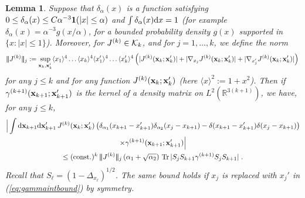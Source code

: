 \documentclass[11pt]{article}
\newtheorem{lemma}[theorem]{Lemma}
\newcommand{\tri}{| \! | \! |}
\newcommand{\rd}{{\rm d}}
\newcommand{\be}{\begin{equation}}
\newcommand{\ee}{\end{equation}}
\newcommand{\bx}{{\bf x}}
\newcommand{\la}{\langle}
\newcommand{\ra}{\rangle}
\newcommand{\bR}{{\mathbb R}}
\newcommand{\tr}{\mbox{Tr}}
\newcommand{\const}{\mathrm{const}}
\newcommand{\cK}{{\cal K}}
\begin{document}
\begin{lemma}\label{lm:sobsob}   Suppose that
$\delta_\alpha(x)$ is  a function satisfying $0 \leq \delta_{\alpha}
(x) \leq C \alpha^{-3} {\bf 1} (|x| \leq \alpha)$ and $\int
\delta_{\alpha} (x) \rd x=1$ (for example $\delta_{\alpha} (x) =
\alpha^{-3} g (x/\alpha)$, for a bounded probability density $g(x)$
supported in $\{ x : |x| \leq 1\}$). Moreover, for $J^{(k)} \in
\cK_k$, and for $j=1,\dots ,k$, we define the norm
\be\label{eq:Jnorm} \tri J^{(k)} \tri_{j} := \sup_{\bx_k, \bx'_k}
\la x_1 \ra^4 \dots \la x_k \ra^4 \la x'_1 \ra^4 \dots \la x'_k
\ra^4  \left( |J^{(k)} (\bx_k ; \bx'_k)| + |\nabla_{x_j} J^{(k)}
(\bx_k;\bx'_k)| + |\nabla_{x'_j} J^{(k)} (\bx_k;\bx'_k)| \right) \,
\ee for any $j\leq k$ and for any function $J^{(k)}(\bx_k ;
\bx'_k)$ (here $\la x \ra^2 := 1+ x^2$).
 Then if $\gamma^{(k+1)} (\bx_{k+1};\bx'_{k+1})$ is the
kernel of a density matrix on $L^2 (\bR^{3(k+1)})$, we have, for any
$j\leq k$,
\begin{multline}\label{eq:gammaintbound}
\Big| \int \rd \bx_{k+1} \rd \bx'_{k+1} \, J^{(k)} (\bx_k ; \bx'_k)
\left(\delta_{\alpha_1} (x_{k+1} - x'_{k+1}) \delta_{\alpha_2} (x_j
-x_{k+1}) - \delta (x_{k+1} -x'_{k+1}) \delta (x_j -
x_{k+1})\right)\\ \times \gamma^{(k+1)} (\bx_{k+1} ; \bx'_{k+1})
\Big| \\ \leq (\const.)^k \, \tri J^{(k)} \tri_j \left( \alpha_1 +
\sqrt{\alpha_2}\right) \, \tr \, | S_j S_{k+1} \gamma^{(k+1)} S_j
S_{k+1}|\;.
\end{multline}
Recall  that $S_{\ell} = (1-\Delta_{x_{\ell}})^{1/2}$.
The same bound holds if $x_j$ is replaced with $x_j'$ in
(\ref{eq:gammaintbound}) by symmetry.
\end{lemma}
\end{document}
